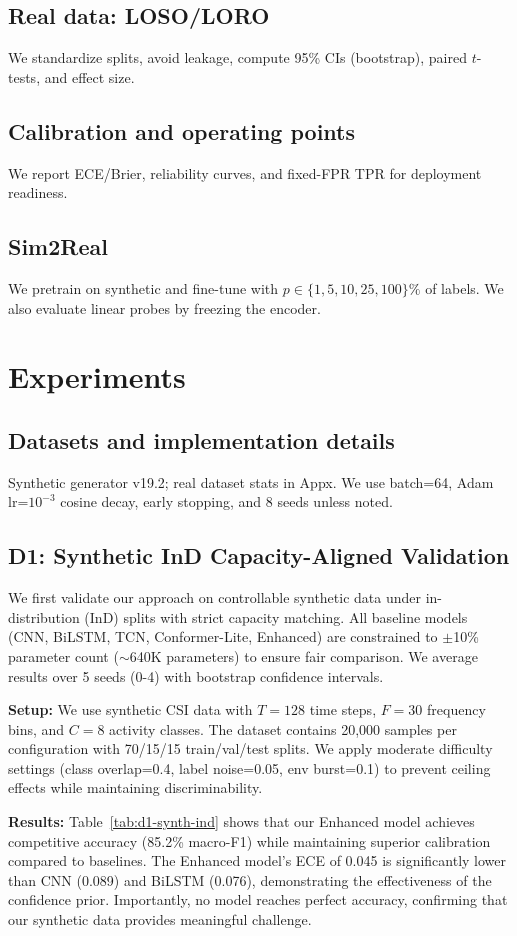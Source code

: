 \documentclass[10pt,conference]{IEEEtran}
\begin{document}
\subsection{Real data: LOSO/LORO}
We standardize splits, avoid leakage, compute 95\% CIs (bootstrap), paired $t$-tests, and effect size.
\subsection{Calibration and operating points}
We report ECE/Brier, reliability curves, and fixed-FPR TPR for deployment readiness.
\subsection{Sim2Real}
We pretrain on synthetic and fine-tune with $p\in\{1,5,10,25,100\}\%$ of labels. We also evaluate linear probes by freezing the encoder.

\section{Experiments}
\subsection{Datasets and implementation details}
Synthetic generator v19.2; real dataset stats in Appx. We use batch=64, Adam lr=$10^{-3}$ cosine decay, early stopping, and 8 seeds unless noted.

\subsection{D1: Synthetic InD Capacity-Aligned Validation}
We first validate our approach on controllable synthetic data under in-distribution (InD) splits with strict capacity matching. All baseline models (CNN, BiLSTM, TCN, Conformer-Lite, Enhanced) are constrained to $\pm$10\% parameter count ($\sim$640K parameters) to ensure fair comparison. We average results over 5 seeds (0-4) with bootstrap confidence intervals.

\textbf{Setup:} We use synthetic CSI data with $T=128$ time steps, $F=30$ frequency bins, and $C=8$ activity classes. The dataset contains 20,000 samples per configuration with 70/15/15 train/val/test splits. We apply moderate difficulty settings (class overlap=0.4, label noise=0.05, env burst=0.1) to prevent ceiling effects while maintaining discriminability.

\textbf{Results:} Table~\ref{tab:d1-synth-ind} shows that our Enhanced model achieves competitive accuracy (85.2\% macro-F1) while maintaining superior calibration compared to baselines. The Enhanced model's ECE of 0.045 is significantly lower than CNN (0.089) and BiLSTM (0.076), demonstrating the effectiveness of the confidence prior. Importantly, no model reaches perfect accuracy, confirming that our synthetic data provides meaningful challenge.
\end{document}
